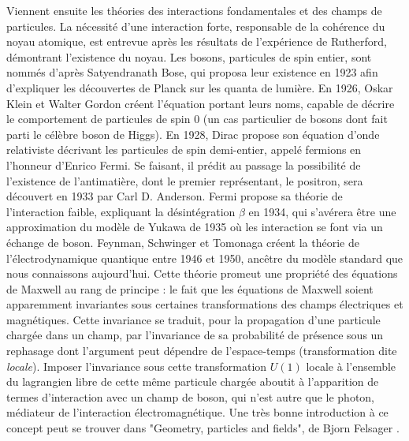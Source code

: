       Viennent ensuite les théories des interactions fondamentales et des champs de particules. La nécessité d'une interaction forte, responsable de la cohérence du noyau atomique, est entrevue après les résultats de l'expérience de Rutherford, démontrant l'existence du noyau. Les bosons, particules de spin entier, sont nommés d'après Satyendranath Bose, qui proposa leur existence en 1923 afin d'expliquer les découvertes de Planck sur les quanta de lumière\cite{Bose1924}. En 1926, Oskar Klein et Walter Gordon\cite{Klein1926,Gordon1926} créent l'équation portant leurs noms, capable de décrire le comportement de particules de spin 0 (un cas particulier de bosons dont fait parti le célèbre boson de Higgs). En 1928, Dirac propose son équation d'onde relativiste décrivant les particules de spin demi-entier, appelé fermions en l'honneur d'Enrico Fermi\cite{Dirac1928}. Se faisant, il prédit au passage la possibilité de l'existence de l'antimatière, dont le premier représentant, le positron, sera découvert en 1933 par Carl D. Anderson\cite{Anderson1933}. Fermi propose sa théorie de l'interaction faible, expliquant la désintégration $\beta$ en 1934\cite{Fermi1934}, qui s'avérera être une approximation du modèle de Yukawa de 1935\cite{Yukawa1935} où les interaction se font via un échange de boson. Feynman, Schwinger et Tomonaga\cite{Tomonaga1946,Schwinger1948,Feynman1998} créent la théorie de l'électrodynamique quantique entre 1946 et 1950, ancêtre du modèle standard que nous connaissons aujourd’hui. Cette théorie promeut une propriété des équations de Maxwell au rang de principe : le fait que les équations de Maxwell soient apparemment invariantes sous certaines transformations des champs électriques et magnétiques. Cette invariance se traduit, pour la propagation d'une particule chargée dans un champ, par l'invariance de sa probabilité de présence sous un rephasage dont l'argument peut dépendre de l'espace-temps (transformation dite \textit{locale}). Imposer l'invariance sous cette transformation $U(1)$ locale à l'ensemble du lagrangien libre de cette même particule chargée aboutit à l'apparition de termes d'interaction avec un champ de boson, qui n'est autre que le photon, médiateur de l'interaction électromagnétique. Une très bonne introduction à ce concept peut se trouver dans "Geometry, particles and fields", de Bjorn Felsager \cite{felsager}.

